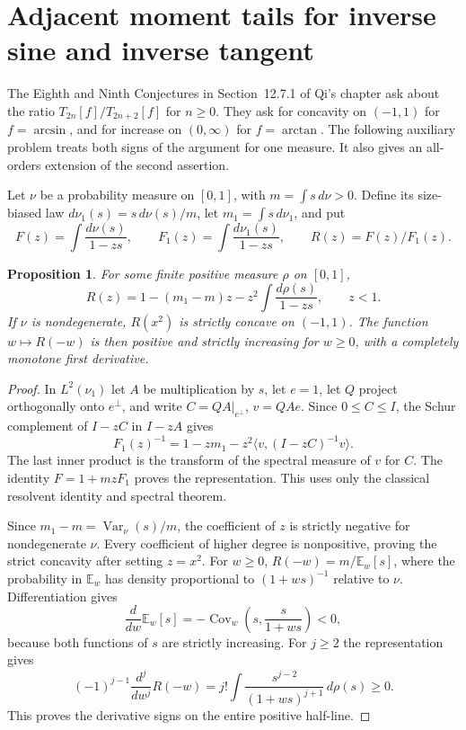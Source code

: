 \documentclass[11pt,a4paper]{article}
\newtheorem{proposition}[theorem]{Proposition}
\numberwithin{equation}{section}
\begin{document}
\section{Adjacent moment tails for inverse sine and inverse tangent}
\label{sec:moment-ratios}
The Eighth and Ninth Conjectures in Section~12.7.1 of Qi's chapter
ask about the ratio $T_{2n}[f]/T_{2n+2}[f]$ for $n\ge0$.
They ask for concavity on $(-1,1)$ for $f=\arcsin$, and for increase
on $(0,\infty)$ for $f=\arctan$. The following auxiliary problem
treats both signs of the argument for one measure. It also gives
an all-orders extension of the second assertion.

Let $\nu$ be a probability measure on $[0,1]$, with
$m=\int s\,d\nu>0$. Define its size-biased law
$d\nu_1(s)=s\,d\nu(s)/m$, let $m_1=\int s\,d\nu_1$, and put
\[
 F(z)=\int\frac{d\nu(s)}{1-zs},\qquad
 F_1(z)=\int\frac{d\nu_1(s)}{1-zs},\qquad R(z)=F(z)/F_1(z).
\]
\begin{proposition}\label{th:sizebias}
For some finite positive measure $\rho$ on $[0,1]$,
\[
 R(z)=1-(m_1-m)z-z^2\int\frac{d\rho(s)}{1-zs},\qquad z<1.
\]
If $\nu$ is nondegenerate, $R(x^2)$ is strictly concave on
$(-1,1)$. The function $w\mapsto R(-w)$ is then positive and strictly
increasing for $w\ge0$, with a completely monotone first derivative.
\end{proposition}
\begin{proof}
In $L^2(\nu_1)$ let $A$ be multiplication by $s$, let $e=1$,
let $Q$ project orthogonally onto $e^\perp$, and write
$C=QA|_{e^\perp}$, $v=QAe$. Since $0\le C\le I$, the
Schur complement of $I-zC$ in $I-zA$ gives
\[
 F_1(z)^{-1}=1-zm_1-z^2\langle v,(I-zC)^{-1}v\rangle .
\]
The last inner product is the transform of the spectral measure
of $v$ for $C$. The identity $F=1+mzF_1$ proves the representation.
This uses only the classical resolvent identity and spectral theorem.

Since $m_1-m=\operatorname{Var}_\nu(s)/m$, the coefficient of $z$
is strictly negative for nondegenerate $\nu$. Every coefficient
of higher degree is nonpositive, proving the strict concavity
after setting $z=x^2$.
For $w\ge0$, $R(-w)=m/\mathbb E_w[s]$, where
the probability in $\mathbb E_w$ has density proportional to
$(1+ws)^{-1}$ relative to $\nu$. Differentiation gives
\[
 \frac{d}{dw}\mathbb E_w[s]
 =-\operatorname{Cov}_w\!\left(s,\frac{s}{1+ws}\right)<0,
\]
because both functions of $s$ are strictly increasing. For $j\ge2$
the representation gives
\[
 (-1)^{j-1}\frac{d^j}{dw^j}R(-w)
 =j!\int\frac{s^{j-2}}{(1+ws)^{j+1}}\,d\rho(s)\ge0 .
\]
This proves the derivative signs on the entire positive half-line.
\end{proof}
\end{document}
